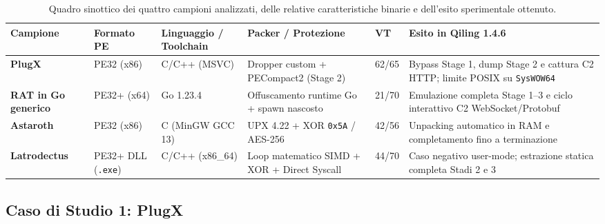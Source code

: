 \documentclass[11pt, a4paper]{article}
\renewcommand{\arraystretch}{1.28}
\begin{document}
\begin{table}[!htbp]
	\centering
	\scriptsize
	\setlength{\tabcolsep}{4.5pt}
	\renewcommand{\arraystretch}{1.35}
	\begin{tabularx}{\textwidth}{|P{1.85cm}|P{1.95cm}|P{2.20cm}|P{3.00cm}|C{0.95cm}|Y|}
		\hline
		\textbf{Campione} & \textbf{Formato PE} & \textbf{Linguaggio / Toolchain} & \textbf{Packer / Protezione} & \textbf{VT} & \textbf{Esito in Qiling 1.4.6} \\
		\hline
		\textbf{PlugX} & PE32 (x86) & C/C++ (MSVC) & Dropper custom + PECompact2 (Stage 2) & 62/65 & Bypass Stage 1, dump Stage 2 e cattura C2 HTTP; limite POSIX su \texttt{SysWOW64} \\
		\hline
		\textbf{RAT in Go generico} & PE32+ (x64) & Go 1.23.4 & Offuscamento runtime Go + spawn nascosto & 21/70 & Emulazione completa Stage 1--3 e ciclo interattivo C2 WebSocket/\allowbreak{}Protobuf \\
		\hline
		\textbf{Astaroth} & PE32 (x86) & C (MinGW GCC 13) & UPX 4.22 + XOR \texttt{0x5A} / AES-256 & 42/56 & Unpacking automatico in RAM e completamento fino a terminazione \\
		\hline
		\textbf{Latrodectus} & PE32+ DLL (\texttt{.exe}) & C/C++ (x86\_64) & Loop matematico SIMD + XOR + Direct Syscall & 44/70 & Caso negativo user-mode; estrazione statica completa Stadi 2 e 3 \\
		\hline
	\end{tabularx}
	\caption{Quadro sinottico dei quattro campioni analizzati, delle relative caratteristiche binarie e dell'esito sperimentale ottenuto.}
	\label{tab:overview_samples}
\end{table}

\subsection{Caso di Studio 1: PlugX}
\end{document}
